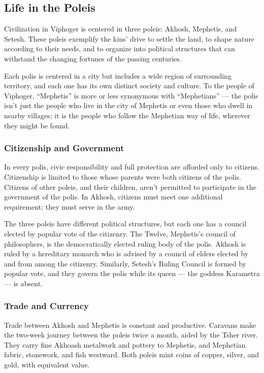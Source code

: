\subsection*{Life in the Poleis} \label{ssec::lifeinthepoleis}
Civilization in Viphoger is centered in three poleis: Akhosh, Mephetis, and Setesh.
These poleis exemplify the kins' drive to settle the land, to shape nature according to their needs, and to organize into political structures that can withstand the changing fortunes of the passing centuries.

Each polis is centered in a city but includes a wide region of surrounding territory, and each one has its own distinct society and culture.
To the people of Viphoger, ``Mephetis'' is more or less synonymous with ``Mephetians'' --- the polis isn't just the people who live in the city of Mephetis or even those who dwell in nearby villages; it is the people who follow the Mephetian way of life, wherever they might be found.

\subsubsection{Citizenship and Government}
In every polis, civic responsibility and full protection are afforded only to citizens.
Citizenship is limited to those whose parents were both citizens of the polis.
Citizens of other poleis, and their children, aren't permitted to participate in the government of the polis.
In Akhosh, citizens must meet one additional requirement: they must serve in the army.

The three poleis have different political structures, but each one has a council elected by popular vote of the citizenry.
The Twelve, Mephetis's council of philosophers, is the democratically elected ruling body of the polis.
Akhosh is ruled by a hereditary monarch who is advised by a council of elders elected by and from among the citizenry.
Similarly, Setesh's Ruling Council is formed by popular vote, and they govern the polis while its queen --- the goddess Karametra --- is absent.

\subsubsection{Trade and Currency}
Trade between Akhosh and Mephetis is constant and productive.
Caravans make the two-week journey between the poleis twice a month, aided by the Tsher river.
They carry fine Akhoash metalwork and pottery to Mephetis, and Mephetian fabric, stonework, and fish westward.
Both poleis mint coins of copper, silver, and gold, with equivalent value.

